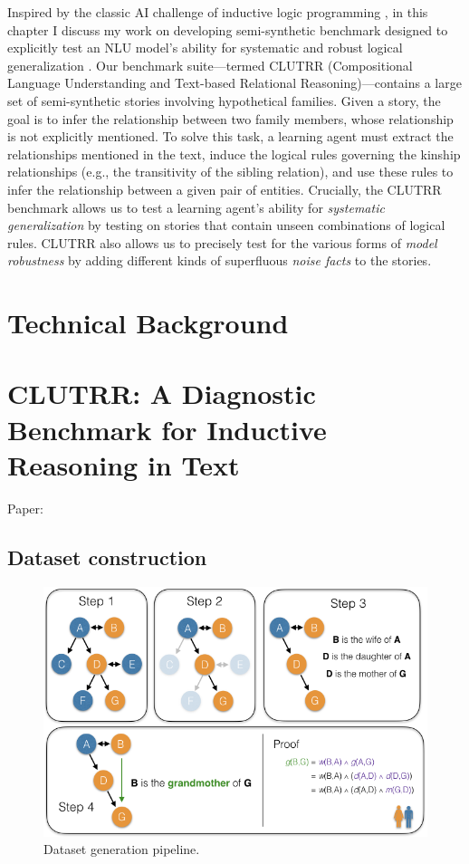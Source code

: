 \documentclass[letterpaper, 12pt]{report}
\begin{document}
Inspired by the classic AI challenge of inductive logic programming \cite{Quinlan1990-iv}, in this chapter I discuss my work on developing semi-synthetic benchmark designed to explicitly test an NLU model's ability for systematic and robust logical generalization \cite{sinha2019a}.
Our benchmark suite---termed CLUTRR (Compositional Language Understanding and Text-based Relational Reasoning)---contains a large set of semi-synthetic stories involving hypothetical families.
Given a story, the goal is to infer the relationship between two family members, whose relationship is not explicitly mentioned.
To solve this task, a learning agent must extract the relationships mentioned in the text, induce the logical rules governing the kinship relationships (e.g., the transitivity of the sibling relation), and use these rules to infer the relationship between a given pair of entities.
Crucially, the CLUTRR benchmark allows us to test a learning agent's ability for \emph{systematic generalization} by testing on stories that contain unseen combinations of logical rules.
CLUTRR also allows us to precisely test for the various forms of \emph{model robustness} by adding different kinds of superfluous \emph{noise facts} to the stories.


\section{Technical Background}
\label{sec:org11db5fd}
\section{CLUTRR: A Diagnostic Benchmark for Inductive Reasoning in Text}
\label{sec:orgf6fb520}

Paper: \cite{sinha2019a}

\subsection{Dataset construction}
\label{sec:org086eed1}

\begin{figure}[htbp]
\centering
\includegraphics[height=0.3\textwidth]{figs/clutrr/dataset_const_proof.png}
\caption{Dataset generation pipeline.}
\end{figure}
\end{document}
